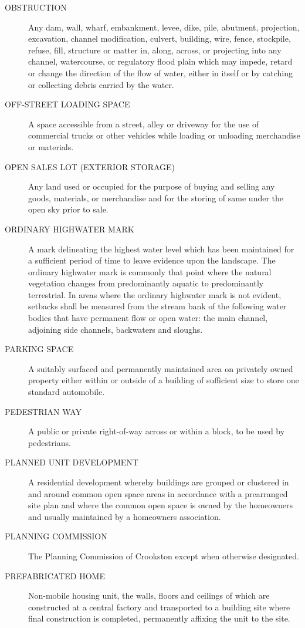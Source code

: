 \begin{description}
    \item[OBSTRUCTION] Any dam, wall, wharf, embankment, levee, dike, pile, abutment, projection, excavation, channel modification, culvert, building, wire, fence, stockpile, refuse, fill, structure or matter in, along, across, or projecting into any channel, watercourse, or regulatory flood plain which may impede, retard or change the direction of the flow of water, either in itself or by catching or collecting debris carried by the water.
    \item[OFF-STREET LOADING SPACE] A space accessible from a street, alley or driveway for the use of commercial trucks or other vehicles while loading or unloading merchandise or materials.
    \item[OPEN SALES LOT (EXTERIOR STORAGE)] Any land used or occupied for the purpose of buying and selling any goods, materials, or merchandise and for the storing of same under the open sky prior to sale.
    \item[ORDINARY HIGHWATER MARK] A mark delineating the highest water level which has been maintained for a sufficient period of time to leave evidence upon the landscape. The ordinary highwater mark is commonly that point where the natural vegetation changes from predominantly aquatic to predominantly terrestrial. In areas where the ordinary highwater mark is not evident, setbacks shall be measured from the stream bank of the following water bodies that have permanent flow or open water: the main channel, adjoining side channels, backwaters and sloughs.
    \item[PARKING SPACE] A suitably surfaced and permanently maintained area on privately owned property either within or outside of a building of sufficient size to store one standard automobile.
    \item[PEDESTRIAN WAY] A public or private right-of-way across or within a block, to be used by pedestrians.
    \item[PLANNED UNIT DEVELOPMENT] A residential development whereby buildings are grouped or clustered in and around common open space areas in accordance with a prearranged site plan and where the common open space is owned by the homeowners and usually maintained by a homeowners association.
    \item[PLANNING COMMISSION] The Planning Commission of Crookston except when otherwise designated.
    \item[PREFABRICATED HOME] Non-mobile housing unit, the walls, floors and ceilings of which are constructed at a central factory and transported to a building site where final construction is completed, permanently affixing the unit to the site.

\end{description}
